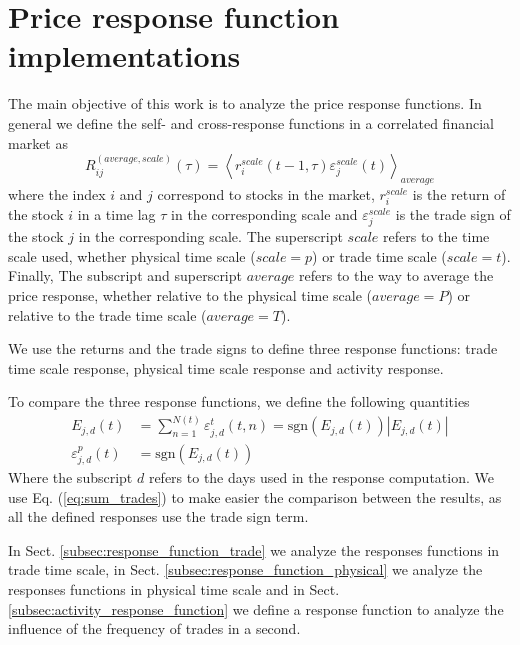 \section{Price response function implementations}
\label{sec:response_functions_imp}

The main objective of this work is to analyze the price response functions. In
general we define the self- and cross-response functions in a correlated
financial market as
\begin{equation}\label{eq:response_general}
    R^{\left(average, scale\right)}_{ij}\left(\tau\right)=\left\langle r^{scale}_{i}\left(t-1,
    \tau\right) \varepsilon^{scale}_{j} \left(t\right)\right\rangle
    _{average}
\end{equation}
where the index $i$ and $j$ correspond to stocks in the market,
$r^{scale}_{i}$ is the return of the stock $i$ in a time lag $\tau$ in the
corresponding scale and $\varepsilon^{scale}_{j}$ is the trade sign of the
stock $j$ in the corresponding scale. The superscript $scale$ refers to the
time scale used, whether physical time scale ($scale = p$) or trade time scale
($scale = t$). Finally, The subscript and superscript $average$ refers to the
way to average the price response, whether relative to the physical time scale
($average = P$) or relative to the trade time scale ($average = T$).

We use the returns and the trade signs to define three response functions:
trade time scale response, physical time scale response and activity response.

To compare the three response functions, we define the following quantities
\begin{align}
    E_{j,d}\left(t\right)&=\sum_{n=1}^{N\left(t\right)}
    \varepsilon_{j,d}^{t}\left(t,n\right) =
    \text{sgn}\left(E_{j,d}\left(t\right)\right)
    \left|E_{j,d}\left(t\right)\right|\label{eq:sum_trades}\\
    \varepsilon_{j,d}^{p}\left(t\right)&=
    \text{sgn}\left(E_{j,d}\left(t\right)\right)\label{eq:sign_sum_trades}
\end{align}
Where the subscript $d$ refers to the days used in the response computation.
We use Eq. (\ref{eq:sum_trades}) to make easier the comparison between the
results, as all the defined responses use the trade sign term.

In Sect. \ref{subsec:response_function_trade} we analyze the responses
functions in trade time scale, in Sect. \ref{subsec:response_function_physical}
we analyze the responses functions in physical time scale and in Sect.
\ref{subsec:activity_response_function} we define a response function to
analyze the influence of the frequency of trades in a second.

